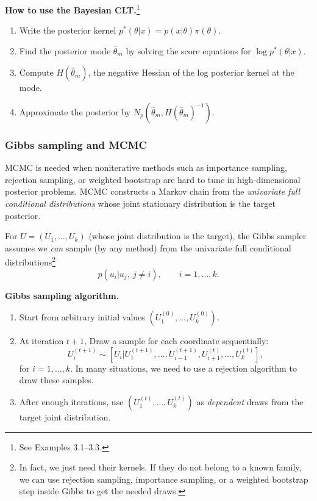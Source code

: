 \begin{mybox}
\textbf{How to use the Bayesian CLT.}\footnote{See Examples 3.1--3.3.}
\begin{enumerate}
    \item Write the posterior kernel $p^*(\theta | x)=p(x | \theta)\pi(\theta)$.
    \item Find the posterior mode $\hat\theta_m$ by solving the score equations for $\log p^*(\theta | x)$.
    \item Compute $H(\hat\theta_m)$, the negative Hessian of the log posterior kernel at the mode.
    \item Approximate the posterior by $N_p(\hat\theta_m,H(\hat\theta_m)^{-1})$.
\end{enumerate}
\end{mybox}


\subsubsection{Gibbs sampling and MCMC}
MCMC is needed when noniterative methods such as importance sampling, rejection sampling, or weighted bootstrap are hard to tune in high-dimensional posterior problems. MCMC constructs a Markov chain from the \emph{univariate full conditional distributions} whose joint stationary distribution is the target posterior.

For $U=(U_1,\ldots,U_k)$ (whose joint distribution is the target), the Gibbs sampler assumes we \emph{can} sample (by any method) from the univariate full conditional distributions\footnote{In fact, we just need their kernels. If they do not belong to a known family, we can use rejection sampling, importance sampling, or a weighted bootstrap step inside Gibbs to get the needed draws.
}
\[
    p(u_i |  u_j,\ j\ne i),
    \qquad i=1,\ldots,k.
\]

\begin{mybox}
\textbf{Gibbs sampling algorithm.}
\begin{enumerate}
    \item Start from arbitrary initial values $(U_1^{(0)},\ldots,U_k^{(0)})$.
    \item At iteration $t+1$, Draw a sample for each coordinate sequentially:
    \[
        U_i^{(t+1)}
        \sim
        [U_i |
        U_1^{(t+1)},\ldots,U_{i-1}^{(t+1)},
        U_{i+1}^{(t)},\ldots,U_k^{(t)}],
    \]
    for $i=1,\ldots,k$. In many situations, we need to use a rejection algorithm to draw these samples.
    \item After enough iterations, use $(U_1^{(t)},\ldots,U_k^{(t)})$ as \emph{dependent} draws from the target joint distribution.
\end{enumerate}
\end{mybox}

